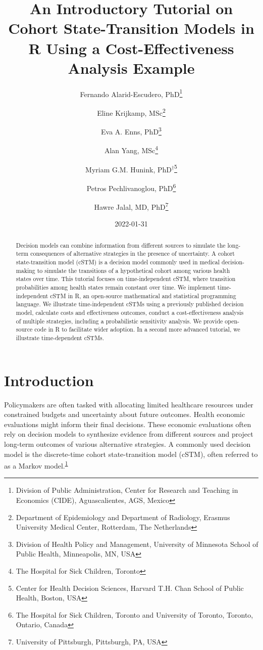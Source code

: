 \documentclass[
]{article}
\title{An Introductory Tutorial on Cohort State-Transition Models in R Using a Cost-Effectiveness Analysis Example}
\author{Fernando Alarid-Escudero, PhD\footnote{Division of Public Administration, Center for Research and Teaching in Economics (CIDE), Aguascalientes, AGS, Mexico} \and Eline Krijkamp, MSc\footnote{Department of Epidemiology and Department of Radiology, Erasmus University Medical Center, Rotterdam, The Netherlands} \and Eva A. Enns, PhD\footnote{Division of Health Policy and Management, University of Minnesota School of Public Health, Minneapolis, MN, USA} \and Alan Yang, MSc\footnote{The Hospital for Sick Children, Toronto} \and Myriam G.M. Hunink, PhD\(^\dagger\)\footnote{Center for Health Decision Sciences, Harvard T.H. Chan School of Public Health, Boston, USA} \and Petros Pechlivanoglou, PhD\footnote{The Hospital for Sick Children, Toronto and University of Toronto, Toronto, Ontario, Canada} \and Hawre Jalal, MD, PhD\footnote{University of Pittsburgh, Pittsburgh, PA, USA}}
\date{2022-01-31}
\begin{document}
\maketitle
\begin{abstract}
Decision models can combine information from different sources to simulate the long-term consequences of alternative strategies in the presence of uncertainty. A cohort state-transition model (cSTM) is a decision model commonly used in medical decision-making to simulate the transitions of a hypothetical cohort among various health states over time. This tutorial focuses on time-independent cSTM, where transition probabilities among health states remain constant over time. We implement time-independent cSTM in R, an open-source mathematical and statistical programming language. We illustrate time-independent cSTMs using a previously published decision model, calculate costs and effectiveness outcomes, conduct a cost-effectiveness analysis of multiple strategies, including a probabilistic sensitivity analysis. We provide open-source code in R to facilitate wider adoption. In a second more advanced tutorial, we illustrate time-dependent cSTMs.
\end{abstract}

{
\setcounter{tocdepth}{2}
\tableofcontents
}
\hypertarget{introduction}{%
\section{Introduction}\label{introduction}}

Policymakers are often tasked with allocating limited healthcare resources under constrained budgets and uncertainty about future outcomes. Health economic evaluations might inform their final decisions. These economic evaluations often rely on decision models to synthesize evidence from different sources and project long-term outcomes of various alternative strategies. A commonly used decision model is the discrete-time cohort state-transition model (cSTM), often referred to as a Markov model.\textsuperscript{\protect\hyperlink{ref-Kuntz2017}{1}}
\end{document}
